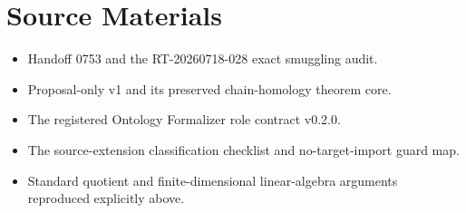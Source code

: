 \documentclass[11pt]{article}
\begin{document}
\section{Source Materials}

\begin{itemize}[leftmargin=*]
  \item Handoff 0753 and the RT-20260718-028 exact smuggling audit.
  \item Proposal-only v1 and its preserved chain-homology theorem core.
  \item The registered Ontology Formalizer role contract v0.2.0.
  \item The source-extension classification checklist and no-target-import
  guard map.
  \item Standard quotient and finite-dimensional linear-algebra arguments
  reproduced explicitly above.
\end{itemize}
\end{document}

